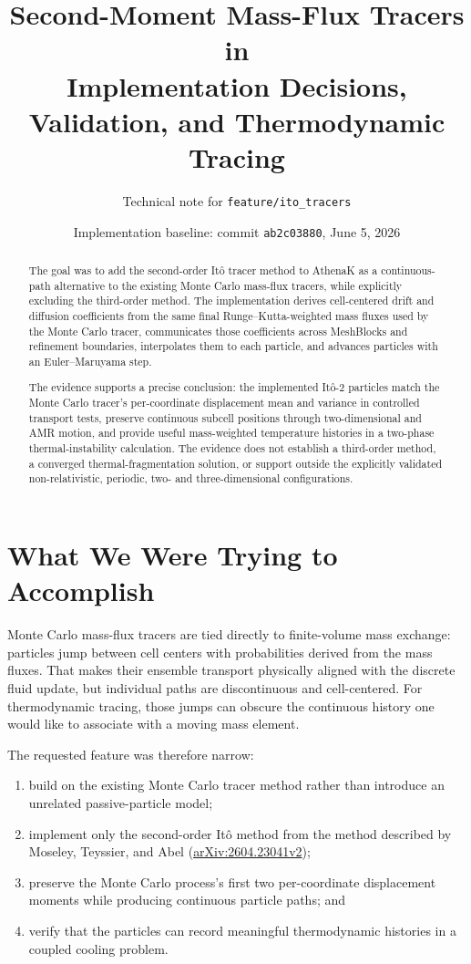 \documentclass[11pt]{article}
\title{\textbf{Second-Moment \Ito{} Mass-Flux Tracers in \AthenaK{}}\\
\large Implementation Decisions, Validation, and Thermodynamic Tracing}
\author{Technical note for \texttt{feature/ito\_tracers}}
\date{Implementation baseline: commit \texttt{ab2c03880}, June 5, 2026}
\newcommand{\Ito}{It\^o}
\newcommand{\AthenaK}{AthenaK}
\begin{document}
\maketitle

\begin{abstract}
The goal was to add the second-order \Ito{} tracer method to \AthenaK{} as a
continuous-path alternative to the existing Monte Carlo mass-flux tracers,
while explicitly excluding the third-order method. The implementation derives
cell-centered drift and diffusion coefficients from the same final
Runge--Kutta-weighted mass fluxes used by the Monte Carlo tracer, communicates
those coefficients across MeshBlocks and refinement boundaries, interpolates
them to each particle, and advances particles with an Euler--Maruyama step.

The evidence supports a precise conclusion: the implemented \Ito{}-2 particles
match the Monte Carlo tracer's per-coordinate displacement mean and variance in
controlled transport tests, preserve continuous subcell positions through
two-dimensional and AMR motion, and provide useful mass-weighted temperature
histories in a two-phase thermal-instability calculation. The evidence does
not establish a third-order method, a converged thermal-fragmentation solution,
or support outside the explicitly validated non-relativistic, periodic,
two- and three-dimensional configurations.
\end{abstract}

\section{What We Were Trying to Accomplish}

Monte Carlo mass-flux tracers are tied directly to finite-volume mass exchange:
particles jump between cell centers with probabilities derived from the mass
fluxes. That makes their ensemble transport physically aligned with the
discrete fluid update, but individual paths are discontinuous and
cell-centered. For thermodynamic tracing, those jumps can obscure the
continuous history one would like to associate with a moving mass element.

The requested feature was therefore narrow:

\begin{enumerate}
  \item build on the existing Monte Carlo tracer method rather than introduce
        an unrelated passive-particle model;
  \item implement only the second-order \Ito{} method from the method described
        by Moseley, Teyssier, and Abel
        (\href{https://arxiv.org/abs/2604.23041}{arXiv:2604.23041v2});
  \item preserve the Monte Carlo process's first two per-coordinate
        displacement moments while producing continuous particle paths; and
  \item verify that the particles can record meaningful thermodynamic
        histories in a coupled cooling problem.
\end{enumerate}
\end{document}
